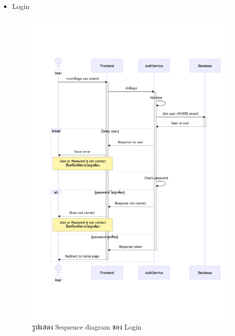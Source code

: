 \documentclass[12pt,oneside,openright,a4paper]{cpe-thai-project}
\begin{document}
\begin{itemize}
    \newpage
    \item Login \\
    \begin{figure}[!ht]\centering
        \includegraphics[width=13cm, trim={0 5cm 0 5cm},clip]{./assets/sequence-diagram/login.png}
        \caption{รูปแสดง Sequence diagram ของ Login}\label{fig:sqLogin}
    \end{figure}


\end{itemize}
\end{document}
